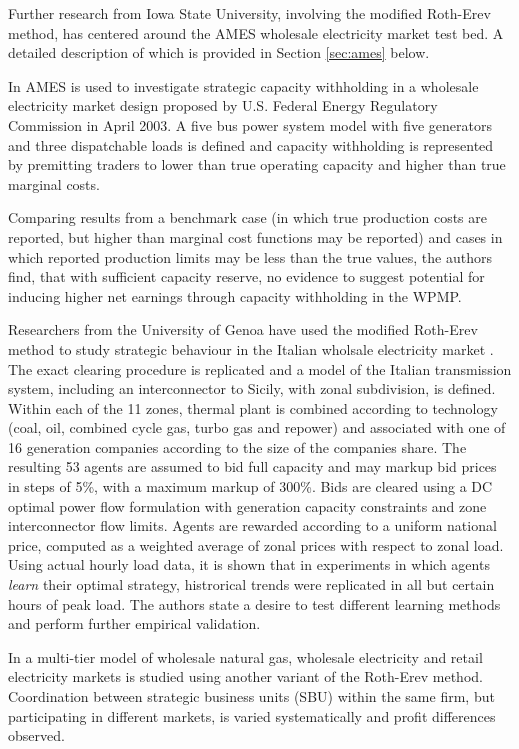Further research from Iowa State University, involving the modified Roth-Erev
method, has centered around the AMES wholesale electricity market test bed.  A
detailed description of which is provided in Section \ref{sec:ames} below.

In \cite{tesfatsi:psce} AMES is used to investigate strategic capacity
withholding in a wholesale electricity market design proposed by U.S. Federal
Energy Regulatory Commission in April 2003.  A five bus power system model with
five generators and three dispatchable loads is defined and capacity withholding
is represented by premitting traders to lower than true operating capacity and
higher than true marginal costs.

Comparing results from a benchmark case (in which true production costs are
reported, but higher than marginal cost functions may be reported) and cases in
which reported production limits may be less than the true values, the authors
find, that with sufficient capacity reserve, no evidence to suggest potential
for inducing higher net earnings through capacity withholding in the WPMP.

Researchers from the University of Genoa have used the modified Roth-Erev
method to study strategic behaviour in the Italian wholsale electricity market
\cite{cincotti:09}.  The exact clearing procedure is replicated and a model of
the Italian transmission system, including an interconnector to Sicily, with
zonal subdivision, is defined.  Within each of the 11 zones, thermal plant is
combined according to technology (coal, oil, combined cycle gas, turbo gas and
repower) and associated with one of 16 generation companies according to the
size of the companies share.  The resulting 53 agents are assumed to bid full
capacity and may markup bid prices in steps of 5\%, with a maximum markup of
300\%.  Bids are cleared using a DC optimal power flow formulation with
generation capacity constraints and zone interconnector flow limits.  Agents are
rewarded according to a uniform national price, computed as a weighted average
of zonal prices with respect to zonal load.  Using actual hourly load data, it
is shown that in experiments in which agents \textit{learn} their optimal
strategy, histrorical trends were replicated in all but certain hours of peak
load.  The authors state a desire to test different learning methods and perform
further empirical validation.

In \cite{micola:08} a multi-tier model of wholesale natural gas, wholesale
electricity and retail electricity markets is studied using another variant of
the Roth-Erev method.  Coordination between strategic business units (SBU)
within the same firm, but participating in different markets, is varied
systematically and profit differences observed.

